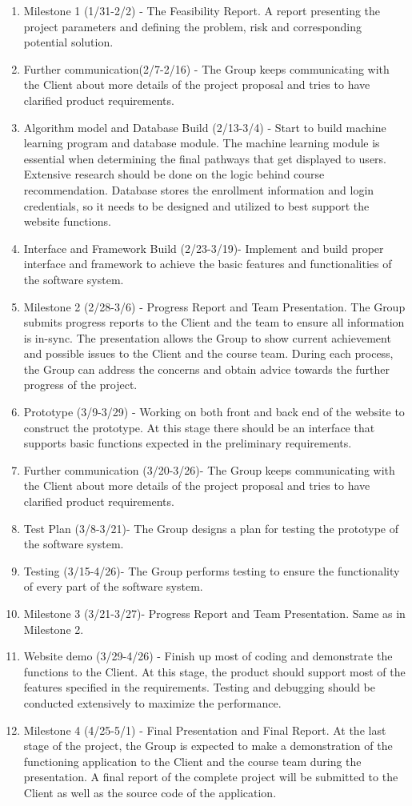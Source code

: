 \documentclass{article}
\begin{document}
\begin{enumerate}[I]
    \item Milestone 1 (1/31-2/2) - The Feasibility Report. A report presenting the project parameters and defining the problem, risk and corresponding potential solution.
    \item Further communication(2/7-2/16) -  The Group keeps communicating with the Client about more details of the project proposal and tries to have clarified product requirements.
    \item Algorithm model and Database Build (2/13-3/4) - Start to build machine learning program and database module. The machine learning module is essential when determining the final pathways that get displayed to users. Extensive research should be done on the logic behind course recommendation. Database stores the enrollment information and login credentials, so it needs to be designed and utilized to best support the website functions. 
    \item Interface and Framework Build (2/23-3/19)- Implement and build proper interface and framework to achieve the basic features and functionalities of the software system.
    \item Milestone 2 (2/28-3/6)  - Progress Report and Team Presentation. The Group submits progress reports to the Client and the team to ensure all information is in-sync. The presentation allows the Group to show current achievement and possible issues to the Client and the course team. During each process, the Group can address the concerns and obtain advice towards the further progress of the project.
    \item Prototype (3/9-3/29) - Working on both front and back end of the website to construct the prototype. At this stage there should be an interface that supports basic functions expected in the preliminary requirements.
    \item Further communication (3/20-3/26)-  The Group keeps communicating with the Client about more details of the project proposal and tries to have clarified product requirements.
    \item Test Plan (3/8-3/21)- The Group designs a plan for testing the prototype of the software system.
    \item Testing (3/15-4/26)- The Group performs testing to ensure the functionality of every part of the software system.
    \item Milestone 3 (3/21-3/27)- Progress Report and Team Presentation. Same as in Milestone 2.
    \item Website demo (3/29-4/26) - Finish up most of coding and demonstrate the functions to the Client. At this stage, the product should support most of the features specified in the requirements. Testing and debugging should be conducted extensively to maximize the performance.
    \item Milestone 4 (4/25-5/1) - Final Presentation and Final Report. At the last stage of the project, the Group is expected to make a demonstration of the functioning application to the Client and the course team during the presentation. A final report of the complete project will be submitted to the Client as well as the source code of the application.
\end{enumerate}
\end{document}
